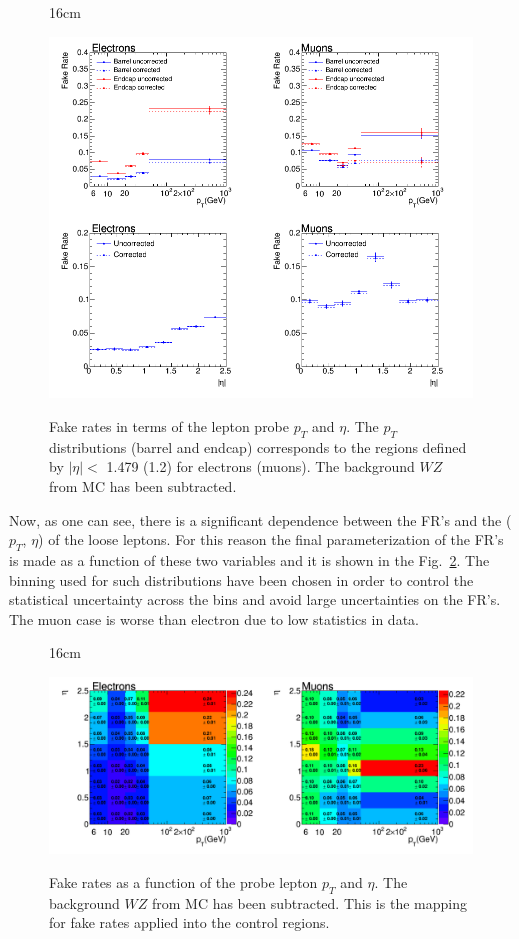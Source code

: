 \begin{figure}[htbp]{16cm}
	\caption{Fake rates in terms of the lepton probe $p_{T}$ and $\eta$. The $p_{T}$ distributions (barrel and endcap) corresponds to the regions defined by $|\eta| <$ 1.479 (1.2) for electrons (muons). The background $WZ$ from MC has been subtracted.}
	\centering
	\includegraphics[scale=0.5]{ChapterAnalysis/figs/fake_rate_1D_pt_eta}
	\label{fig:fake_rates}
\end{figure}

Now, as one can see, there is a significant dependence between the FR's and the ($p_{T}$, $\eta$) of the loose leptons. For this reason the final parameterization of the FR's is made as a function of these two variables and it is shown in the Fig.~\ref{fig:fake_rates_2d}. The binning used for such distributions have been chosen in order to control the statistical uncertainty across the bins and avoid large uncertainties on the FR's. The muon case is worse than electron due to low statistics in data.

\begin{figure}[htbp]{16cm}
	\caption{Fake rates as a function of the probe lepton $p_{T}$ and $\eta$. The background $WZ$ from MC has been subtracted. This is the mapping for fake rates applied into the control regions.}
	\centering
	\includegraphics[scale=0.37]{ChapterAnalysis/figs/fake_rate_2D_maps_corrected}
	\label{fig:fake_rates_2d}
\end{figure}


